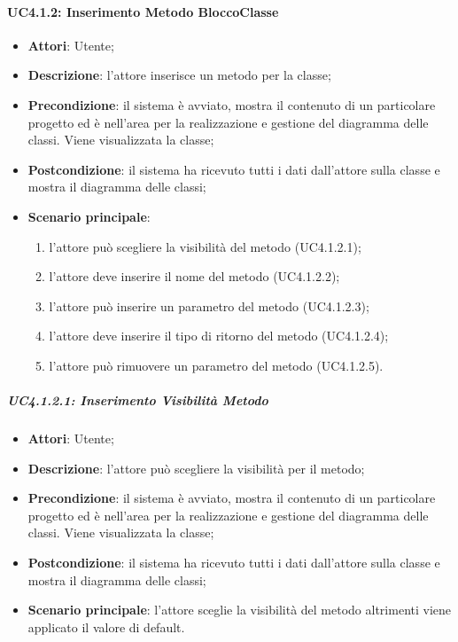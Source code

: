 \paragraph{UC4.1.2: Inserimento Metodo BloccoClasse}
\label{UC4.1.2}
\begin{itemize}
	\item \textbf{Attori}: Utente;
	\item \textbf{Descrizione}: l'attore inserisce un metodo per la classe;
	\item \textbf{Precondizione}:  il sistema è avviato, mostra il contenuto di un particolare progetto ed è nell'area per la realizzazione e gestione del diagramma delle classi. Viene visualizzata la classe;
	\item \textbf{Postcondizione}: il sistema ha ricevuto tutti i dati dall'attore sulla classe e mostra il diagramma delle classi;
	\item \textbf{Scenario principale}:
	\begin{enumerate}
		\item l'attore può scegliere la visibilità del metodo (UC4.1.2.1);
		\item l'attore deve inserire il nome del metodo (UC4.1.2.2);
		\item l'attore può inserire un parametro del metodo (UC4.1.2.3);
		\item l'attore deve inserire il tipo di ritorno del metodo (UC4.1.2.4);
		\item l'attore può rimuovere un parametro del metodo (UC4.1.2.5).
	\end{enumerate}
\end{itemize}

\subparagraph{UC4.1.2.1: Inserimento Visibilità Metodo}
\label{UC4.1.2.1}
\begin{itemize}
	\item \textbf{Attori}: Utente;
	\item \textbf{Descrizione}: l'attore può scegliere la visibilità per il metodo;
	\item \textbf{Precondizione}:  il sistema è avviato, mostra il contenuto di un particolare progetto ed è nell'area per la realizzazione e gestione del diagramma delle classi. Viene visualizzata la classe;
	\item \textbf{Postcondizione}: il sistema ha ricevuto tutti i dati dall'attore sulla classe e mostra il diagramma delle classi;
	\item \textbf{Scenario principale}: l'attore sceglie la visibilità del metodo altrimenti viene applicato il valore di default.
\end{itemize}

